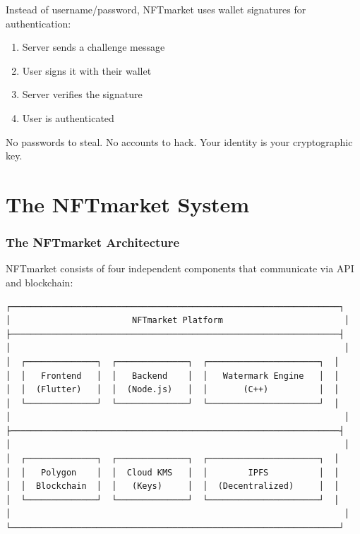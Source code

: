 \documentclass[11pt,a4paper]{article}
\begin{document}
Instead of username/password, NFTmarket uses wallet signatures for authentication:

\begin{enumerate}
    \item Server sends a challenge message
    \item User signs it with their wallet
    \item Server verifies the signature
    \item User is authenticated
\end{enumerate}

No passwords to steal. No accounts to hack. Your identity is your cryptographic key.

\newpage
\part{The NFTmarket System}

\section{The NFTmarket Architecture}

NFTmarket consists of four independent components that communicate via API and blockchain:

\begin{mdframed}[style=codeblock]
\begin{verbatim}
┌─────────────────────────────────────────────────────────────────┐
│                        NFTmarket Platform                        │
├─────────────────────────────────────────────────────────────────┤
│                                                                  │
│  ┌──────────────┐  ┌──────────────┐  ┌──────────────────────┐  │
│  │   Frontend   │  │   Backend    │  │   Watermark Engine   │  │
│  │  (Flutter)   │  │  (Node.js)   │  │       (C++)          │  │
│  └──────────────┘  └──────────────┘  └──────────────────────┘  │
│                                                                  │
├─────────────────────────────────────────────────────────────────┤
│                                                                  │
│  ┌──────────────┐  ┌──────────────┐  ┌──────────────────────┐  │
│  │   Polygon    │  │  Cloud KMS   │  │        IPFS          │  │
│  │  Blockchain  │  │   (Keys)     │  │  (Decentralized)     │  │
│  └──────────────┘  └──────────────┘  └──────────────────────┘  │
│                                                                  │
└─────────────────────────────────────────────────────────────────┘
\end{verbatim}
\end{mdframed}
\end{document}
